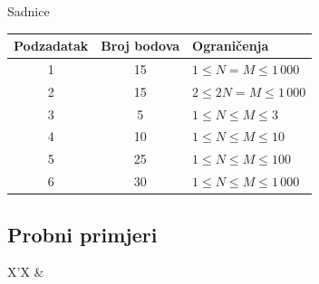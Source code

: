 \begin{statement}[
  problempoints=100,
  timelimit=3 sekunde,
  memorylimit=512 MiB,
]{Sadnice}
{\renewcommand{\arraystretch}{1.4}
  \setlength{\tabcolsep}{6pt}
  \begin{tabular}{ccl}
 Podzadatak & Broj bodova & Ograničenja \\ \midrule
  1 & 15 & $1 \le N = M \le 1\,000$ \\
  2 & 15 & $2 \le 2N = M \le 1\,000$ \\
  3 & 5 & $1 \le N \le M \le 3$ \\
  4 & 10 & $1 \le N \le M \le 10$ \\
  5 & 25 & $1 \le N \le M \le 100$ \\
  6 & 30 & $1 \le N \le M \le 1\,000$ \\
\end{tabular}}

\subsection*{Probni primjeri}
\begin{tabularx}{\textwidth}{X'X}
 &
\end{tabularx}


\end{statement}

